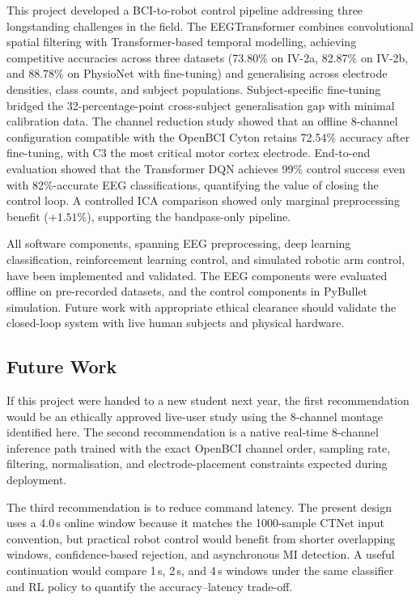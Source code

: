 \documentclass[12pt, a4paper]{article}
\begin{document}
This project developed a BCI-to-robot control pipeline addressing three longstanding challenges in the field. The EEGTransformer combines convolutional spatial filtering with Transformer-based temporal modelling, achieving competitive accuracies across three datasets (73.80\% on IV-2a, 82.87\% on IV-2b, and 88.78\% on PhysioNet with fine-tuning) and generalising across electrode densities, class counts, and subject populations. Subject-specific fine-tuning bridged the 32-percentage-point cross-subject generalisation gap with minimal calibration data. The channel reduction study showed that an offline 8-channel configuration compatible with the OpenBCI Cyton retains 72.54\% accuracy after fine-tuning, with C3 the most critical motor cortex electrode. End-to-end evaluation showed that the Transformer DQN achieves 99\% control success even with 82\%-accurate EEG classifications, quantifying the value of closing the control loop. A controlled ICA comparison showed only marginal preprocessing benefit ($+1.51\%$), supporting the bandpass-only pipeline.

All software components, spanning EEG preprocessing, deep learning classification, reinforcement learning control, and simulated robotic arm control, have been implemented and validated. The EEG components were evaluated offline on pre-recorded datasets, and the control components in PyBullet simulation. Future work with appropriate ethical clearance should validate the closed-loop system with live human subjects and physical hardware.

\subsection{Future Work}

If this project were handed to a new student next year, the first recommendation would be an ethically approved live-user study using the 8-channel montage identified here. The second recommendation is a native real-time 8-channel inference path trained with the exact OpenBCI channel order, sampling rate, filtering, normalisation, and electrode-placement constraints expected during deployment.

The third recommendation is to reduce command latency. The present design uses a 4.0\,s online window because it matches the 1000-sample CTNet input convention, but practical robot control would benefit from shorter overlapping windows, confidence-based rejection, and asynchronous MI detection. A useful continuation would compare 1\,s, 2\,s, and 4\,s windows under the same classifier and RL policy to quantify the accuracy--latency trade-off.
\end{document}

